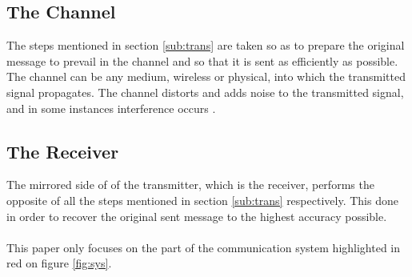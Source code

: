 \documentclass[11pt]{report}
\begin{document}
\subsection{The Channel}
The steps mentioned in section \ref{sub:trans} are taken so as to  prepare the original message to prevail in the channel and so that it is sent as efficiently as possible. The channel can be any medium, wireless or physical, into which the transmitted signal propagates. The channel distorts and adds noise to the transmitted signal, and in some instances interference occurs \cite{B10}. 

\subsection{The Receiver}
The mirrored side of of the transmitter, which is the receiver, performs the opposite of all the steps mentioned in section \ref{sub:trans} respectively. This done in order to recover the original sent message to the highest accuracy possible. 
\\
\\
This paper only focuses on the part of the communication system highlighted in red on figure \ref{fig:sys}.


\end{document}
